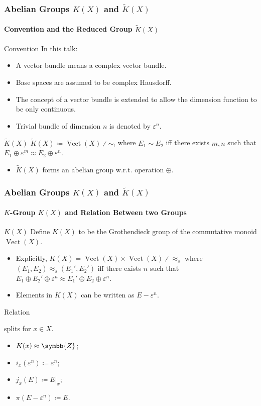 \documentclass[noamsthm]{beamer}
\DeclareMathOperator\Vect{Vect}
\newcommand\iso{\approx}
\newcommand\BZ{\symbb{Z}}
\newcommand\rk{\tilde{K}}
\newcommand\ordsim{\mathord{\sim}}
\newcommand\triv[1]{\varepsilon^{#1}}
\begin{document}
  \begin{frame}
    \frametitle{Abelian Groups $K(X)$ and $\rk(X)$}
    \framesubtitle{Convention and the Reduced Group $\rk(X)$}
    \begin{block}{Convention}
      In this talk:
      \begin{itemize}
        \item A vector bundle means a complex vector bundle.
        \item Base spaces are assumed to be complex Hausdorff.
        \item The concept of a vector bundle is extended to allow the dimension function to be only continuous.
        \item Trivial bundle of dimension $n$ is denoted by $\triv n$.
      \end{itemize}
    \end{block}
    \begin{block}{$\rk(X)$}
      $\rk(X)\coloneq \Vect(X)\divslash\ordsim$, where $E_1\sim E_2$ iff there exists $m, n$ such that $E_1\oplus \triv m\iso E_2\oplus \triv n$.
    \end{block}
    \begin{itemize}
      \item $\rk(X)$ forms an abelian group w.r.t. operation $\mathord{\oplus}$.
    \end{itemize}
  \end{frame}
  \begin{frame}
    \frametitle{Abelian Groups $K(X)$ and $\rk(X)$}
    \framesubtitle{$K$-Group $K(X)$ and Relation Between two Groups}
    \begin{block}{$K(X)$}
      Define $K(X)$ to be the Grothendieck group of the commutative monoid $\Vect(X)$.
    \end{block}
    \begin{itemize}
      \item Explicitly, $K(X)=\Vect(X)\times\Vect(X)\divslash\mathord{\iso_{s}}$ where $(E_1, E_2)\iso_s(E_1', E_2')$ iff there exists $n$ such that $E_1\oplus E_2'\oplus\triv{n}\iso E_1'\oplus E_2\oplus\triv{n}$.
      \item Elements in $K(X)$ can be written as $E-\triv{n}$.
    \end{itemize}
    \begin{block}{Relation}
      splits for $x\in X$.
      \begin{itemize}
        \item $K(x)\iso \BZ$;
        \item $i_x(\triv{n})\coloneq\triv{n}$;
        \item $j_x(E)\coloneq E\vert_x$;
        \item $\pi(E-\triv{n}) \coloneq E$.
      \end{itemize}
    \end{block}
  \end{frame}
\end{document}
